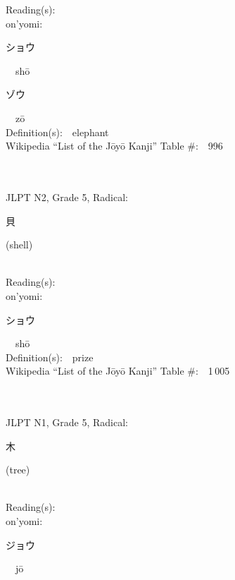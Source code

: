 \begin{multicols}{2}
Reading(s):\ \ \\
{\hspace*{1em}}on'yomi:\ \ \\
{\hspace*{2em}}{\begin{CJK}{UTF8}{min} ショウ \end{CJK}}\ \ sh\=o\ \ \\
{\hspace*{2em}}{\begin{CJK}{UTF8}{min} ゾウ \end{CJK}}\ \ z\=o\ \ \\
Definition(s):\ \ elephant \\
Wikipedia ``List of the J\=oy\=o Kanji'' Table \#:\ \ 996 \\
\ \ \\
{\fontsize{34pt}{40pt}  }\ \ \\  %
{JLPT N2, Grade 5, Radical:\ \ {\begin{CJK}{UTF8}{min} 貝 \end{CJK}} (shell) } \\
Reading(s):\ \ \\
{\hspace*{1em}}on'yomi:\ \ \\
{\hspace*{2em}}{\begin{CJK}{UTF8}{min} ショウ \end{CJK}}\ \ sh\=o\ \ \\
Definition(s):\ \ prize \\
Wikipedia ``List of the J\=oy\=o Kanji'' Table \#:\ \ 1\,005 \\
\ \ \\
{\fontsize{34pt}{40pt}  }\ \ \\  %
{JLPT N1, Grade 5, Radical:\ \ {\begin{CJK}{UTF8}{min} 木 \end{CJK}} (tree) } \\
Reading(s):\ \ \\
{\hspace*{1em}}on'yomi:\ \ \\
{\hspace*{2em}}{\begin{CJK}{UTF8}{min} ジョウ \end{CJK}}\ \ j\=o\ \ \\

\end{multicols}
